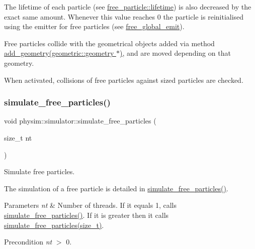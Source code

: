 The lifetime of each particle (see \hyperlink{classphysim_1_1particles_1_1free__particle_a5870d6fd3167d2c6120f887f45fe50fc}{free\+\_\+particle\+::lifetime}) is also decreased by the exact same amount. Whenever this value reaches 0 the particle is reinitialised using the emitter for free particles (see \hyperlink{classphysim_1_1simulator_a05e2840fc39c644d7005ea938e63202f}{free\+\_\+global\+\_\+emit}).

Free particles collide with the geometrical objects added via method \hyperlink{classphysim_1_1simulator_a92a79231495f047789176a19857735ff}{add\+\_\+geometry(geometric\+::geometry $\ast$)}, and are moved depending on that geometry.

When activated, collisions of free particles against sized particles are checked. \mbox{\label{classphysim_1_1simulator_af4c6a7a02feeb89263fa557a1ea3de7e}} 
\subsubsection{\texorpdfstring{simulate\+\_\+free\+\_\+particles()}{simulate\_free\_particles()}\hspace{0.1cm}{\footnotesize\ttfamily [2/2]}}
{\footnotesize\ttfamily void physim\+::simulator\+::simulate\+\_\+free\+\_\+particles (\begin{DoxyParamCaption}\item[{size\+\_\+t}]{nt }\end{DoxyParamCaption})}



Simulate free particles. 

The simulation of a free particle is detailed in \hyperlink{classphysim_1_1simulator_ac836fc5c8ccf186b8030da54586a8b07}{simulate\+\_\+free\+\_\+particles()}.


\begin{DoxyParams}{Parameters}
{\em nt} & Number of threads. If it equals 1, calls \hyperlink{classphysim_1_1simulator_ac836fc5c8ccf186b8030da54586a8b07}{simulate\+\_\+free\+\_\+particles()}. If it is greater then it calls \hyperlink{classphysim_1_1simulator_af4c6a7a02feeb89263fa557a1ea3de7e}{simulate\+\_\+free\+\_\+particles(size\+\_\+t)}. \\
\hline
\end{DoxyParams}
\begin{DoxyPrecond}{Precondition}
{\itshape nt} $>$ 0. 
\end{DoxyPrecond}
\mbox{\label{classphysim_1_1simulator_aea4165314f9285dfc3b64ba9a2666aaf}} 
